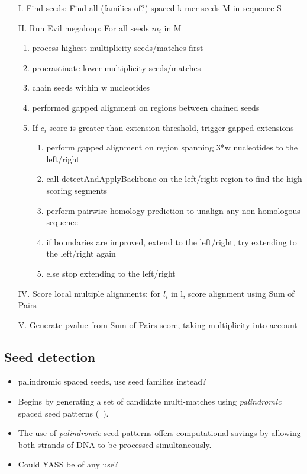 \documentclass{llncs}
\begin{document}
\begin{enumerate}
\item[I.] Find seeds: Find all (families of?) spaced k-mer seeds M in sequence S
\item[II.] Run Evil megaloop: For all seeds $m_{i}$ in M
\begin{enumerate}
\item process highest multiplicity seeds/matches first
\item procrastinate lower multiplicity seeds/matches
\item chain seeds within w nucleotides
\item performed gapped alignment on regions between chained seeds
\item If $c_{i}$ score is greater than extension threshold, trigger gapped extensions
\begin{enumerate}
\item perform gapped alignment on region spanning 3*w nucleotides to the left/right
\item call detectAndApplyBackbone on the left/right region to find the high scoring segments
\item perform pairwise homology prediction to unalign any non-homologous sequence
\item if boundaries are improved, extend to the left/right, try extending to the left/right again
\item else stop extending to the left/right
\end{enumerate}
\end{enumerate}
\item[IV.] Score local multiple alignments: for $l_{i}$ in l, score alignment using Sum of Pairs
\item[V.] Generate pvalue from Sum of Pairs score, taking multiplicity into account
\end{enumerate}


\subsection{Seed detection}
\begin{itemize}

\item palindromic spaced seeds, use seed families instead?

\item Begins by generating a set of candidate multi-matches using \textit{palindromic} spaced
seed patterns (~\cite{ref-procrast}).

\item The use of
\textit{palindromic} seed patterns offers computational savings by
allowing both strands of DNA to be processed simultaneously.

\item Could YASS be of any use?

\end{itemize}
\end{document}
